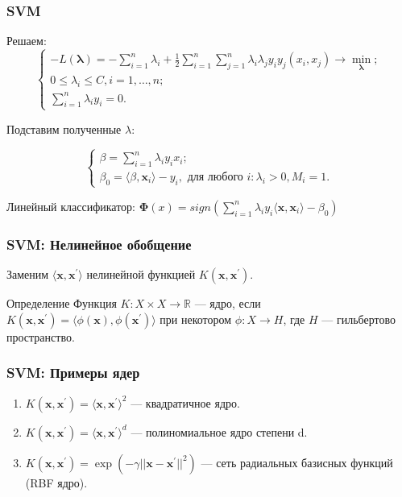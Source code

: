 \documentclass[11pt]{beamer}
\begin{document}
	\begin{frame}
	\frametitle{SVM}
	
	Решаем: 
	$$
		\begin{cases}
			-L(\bm{\lambda}) = - \sum\limits_{i=1}^n \lambda_i + \frac{1}{2} \sum\limits_{i=1}^{n}\sum\limits_{j=1}^{n} \lambda_i \lambda_j y_i y_j (x_i, x_j) \rightarrow \min\limits_{\bm{\lambda}}; \\
			0 \leqslant \lambda_i \leqslant C, i = 1, \dotsc, n; \\
			\sum\limits_{i=1}^{n} \lambda_i y_i = 0.
		\end{cases}
	$$
	
	Подставим полученные $\lambda$:
	
	$$
	\begin{cases}
		\beta = \sum\limits_{i=1}^n \lambda_i y_i x_i;\\
		\beta_0 = \langle\beta, \bm{x}_i\rangle - y_i, \text{ для любого } i: \lambda_i > 0, M_i = 1.
	\end{cases}
	$$
	
	Линейный классификатор: $ \bm{\Phi}(x) = sign ( \sum\limits_{i=1}^{n} \lambda_i y_i \langle\bm{x}, \bm{x}_i\rangle - \beta_0) $
	\end{frame}	
	
	\begin{frame}
		\frametitle{SVM: Нелинейное обобщение}
		Заменим $\langle \bm{x}, \bm{x}^{'} \rangle$ нелинейной функцией $K(\bm{x}, \bm{x}^{'})$.
		
		\begin{block}{Определение}
			Функция $K: X \times X \rightarrow \mathbb{R}$ --- ядро, если $K(\bm{x}, \bm{x}^{'}) = \langle \phi(\bm{x}), \phi(\bm{x}^{'}) \rangle$ при некотором $\phi: X \rightarrow H$, где $H$ --- гильбертово пространство.
		\end{block}
	\end{frame}

	\begin{frame}
		\frametitle{SVM: Примеры ядер}
		\begin{enumerate}
			\item $K(\bm{x}, \bm{x}^{'}) = \langle\bm{x}, \bm{x}^{'} \rangle^2$ --- квадратичное ядро. 
			\item $K(\bm{x}, \bm{x}^{'}) = \langle \bm{x}, \bm{x}^{'} \rangle^d$ --- полиномиальное ядро степени d. 
			\item $K(\bm{x}, \bm{x}^{'}) = \exp(-\gamma ||\bm{x} -  \bm{x}^{'}||^2) $ --- сеть радиальных базисных функций (RBF ядро).
		\end{enumerate}
	\end{frame}
\end{document}
